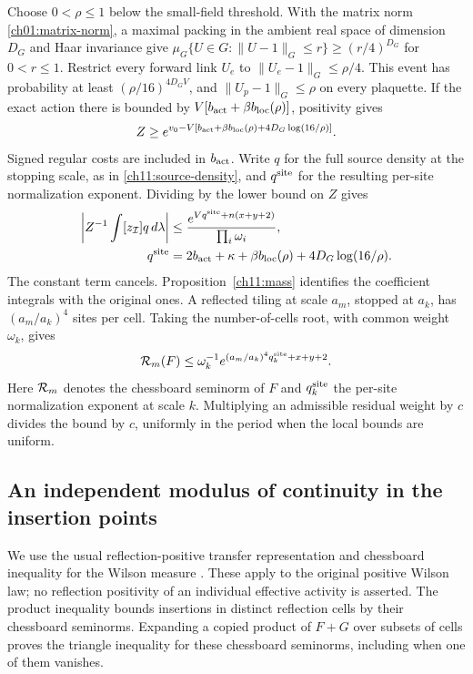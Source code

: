 Choose $0<\rho\le1$ below the small-field threshold. With the matrix
norm \eqref{ch01:matrix-norm}, a maximal packing in the ambient real
space of dimension $D_G$ and Haar invariance give
$\mu_G\{U\in G:\|U-1\|_G\le r\}\ge(r/4)^{D_G}$ for $0<r\le1$.
Restrict every forward link $U_e$ to $\|U_e-1\|_G\le\rho/4$.
This event has probability at least $(\rho/16)^{4D_GV}$, and
$\|U_p-1\|_G\le\rho$ on every plaquette. If the exact action there is bounded by
$V[b_{\rm act}+\beta b_{\rm loc}(\rho)]$, positivity gives
\[
 Z\ge e^{v_0-V[b_{\rm act}+\beta b_{\rm loc}(\rho)
                         +4D_G\log(16/\rho)]}.
\]
Signed regular costs are included in $b_{\rm act}$. Write $q$ for the full source density at the stopping scale, as in
\eqref{ch11:source-density}, and $q^{\rm site}$ for the resulting
per-site normalization exponent. Dividing by the lower bound on $Z$ gives
\begin{align}
 \left|Z^{-1}\int[z_{\mathcal I}]q\,d\lambda\right|
 &\le\frac{e^{Vq^{\rm site}+n(x+y+2)}}{\prod_i\omega_i},\notag\\
 q^{\rm site}&=2b_{\rm act}+\kappa+\beta b_{\rm loc}(\rho)
                  +4D_G\log(16/\rho).
 \label{ch11:replicated-bound}
\end{align}
The constant term cancels. Proposition~\ref{ch11:mass} identifies the
coefficient integrals with the original ones. A reflected tiling at
scale $a_m$, stopped at $a_k$, has $(a_m/a_k)^4$ sites per cell.
Taking the number-of-cells root, with common weight $\omega_k$, gives
\begin{equation}
 {\cal R}_m(F)\le\omega_k^{-1}e^{(a_m/a_k)^4q_k^{\rm site}+x+y+2}.
 \label{ch11:root-bound}
\end{equation}
Here ${\cal R}_m$ denotes the chessboard seminorm of $F$ and
$q_k^{\rm site}$ the per-site normalization exponent at scale $k$.
Multiplying an admissible residual weight by $c$ divides the bound
by $c$, uniformly in the period when the local bounds are uniform.


\subsection{An independent modulus of continuity in the insertion points}
\label{ch11:positional}

We use the usual reflection-positive transfer representation and
chessboard inequality for the Wilson measure
\cite{OsterwalderSeiler1978,FrohlichIsraelLiebSimon1978}.
These apply to the original positive Wilson law; no reflection
positivity of an individual effective activity is asserted.
The product inequality bounds insertions in distinct reflection cells
by their chessboard seminorms. Expanding a copied product of
$F+G$ over subsets of cells proves the triangle inequality for these
chessboard seminorms, including when one of them vanishes.

